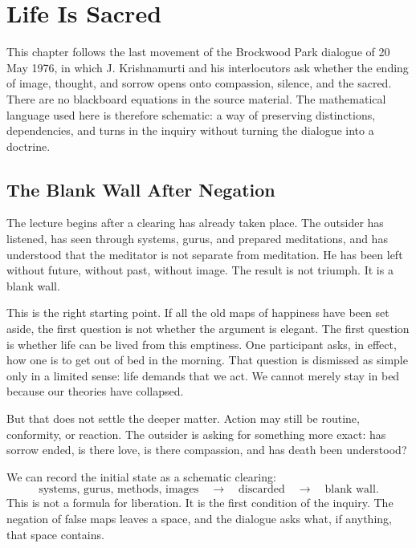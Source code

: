 \chapter{Life Is Sacred}

This chapter follows the last movement of the Brockwood Park dialogue of 20 May 1976, in which J. Krishnamurti and his interlocutors ask whether the ending of image, thought, and sorrow opens onto compassion, silence, and the sacred. There are no blackboard equations in the source material. The mathematical language used here is therefore schematic: a way of preserving distinctions, dependencies, and turns in the inquiry without turning the dialogue into a doctrine.

\section{The Blank Wall After Negation}

The lecture begins after a clearing has already taken place. The outsider has listened, has seen through systems, gurus, and prepared meditations, and has understood that the meditator is not separate from meditation. He has been left without future, without past, without image. The result is not triumph. It is a blank wall.

This is the right starting point. If all the old maps of happiness have been set aside, the first question is not whether the argument is elegant. The first question is whether life can be lived from this emptiness. One participant asks, in effect, how one is to get out of bed in the morning. That question is dismissed as simple only in a limited sense: life demands that we act. We cannot merely stay in bed because our theories have collapsed.

But that does not settle the deeper matter. Action may still be routine, conformity, or reaction. The outsider is asking for something more exact: has sorrow ended, is there love, is there compassion, and has death been understood?

We can record the initial state as a schematic clearing:
\begin{equation}
\text{systems, gurus, methods, images}
\quad \longrightarrow \quad
\text{discarded}
\quad \longrightarrow \quad
\text{blank wall}.
\end{equation}
This is not a formula for liberation. It is the first condition of the inquiry. The negation of false maps leaves a space, and the dialogue asks what, if anything, that space contains.

